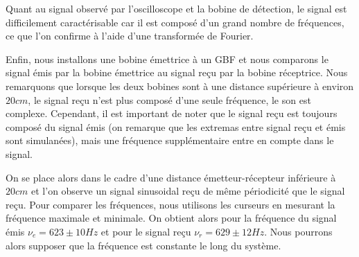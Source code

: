 \documentclass[12pt]{article}
\begin{document}
Quant au signal observé par l'oscilloscope et la bobine de détection, le signal est difficilement caractérisable car il est composé d'un grand nombre de fréquences, ce que
l'on confirme à l'aide d'une transformée de Fourier.

Enfin, nous installons une bobine émettrice à un GBF  et nous comparons le signal émis par la bobine émettrice au signal reçu par la bobine réceptrice.
Nous remarquons que lorsque les deux bobines sont à une distance supérieure à environ $20cm$, le signal reçu n'est plus composé d'une seule fréquence, le son est complexe.
Cependant, il est important de noter que le signal reçu est toujours composé du signal émis (on remarque que les extremas entre signal reçu et émis sont simulanées), mais une fréquence supplémentaire
entre en compte dans le signal. 

On se place alors dans le cadre d'une distance émetteur-récepteur inférieure à $20cm$ et l'on observe un signal sinusoidal reçu de même périodicité que le signal reçu. Pour comparer les fréquences,
nous utilisons les curseurs en mesurant la fréquence maximale et minimale. On obtient alors pour la fréquence du signal émis $\nu_e = 623 \pm 10 Hz$ et pour le signal reçu $\nu_r = 629 \pm 12 Hz$. Nous pourrons alors supposer
que la fréquence est constante le long du système.

\break
\end{document}
